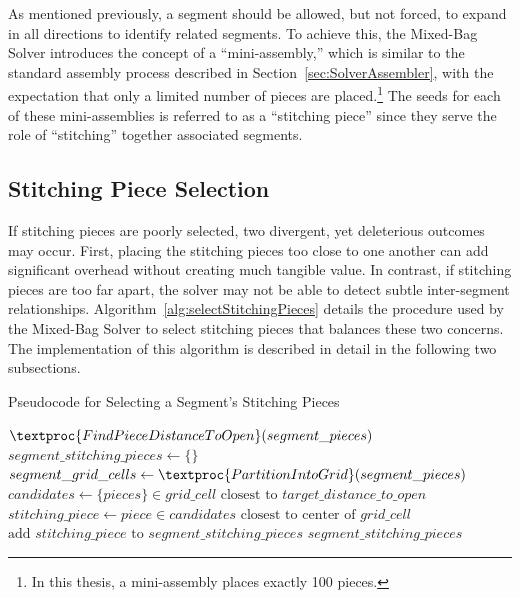 As mentioned previously, a segment should be allowed, but not forced, to expand in all directions to identify related segments.  To achieve this, the Mixed-Bag Solver introduces the concept of a ``mini-assembly,'' which is similar to the standard assembly process described in Section~\ref{sec:SolverAssembler}, with the expectation that only a limited number of pieces are placed.\footnote{In this thesis, a mini-assembly places exactly 100 pieces.}  The seeds for each of these mini-assemblies is referred to as a ``stitching piece'' since they serve the role of ``stitching'' together associated segments.

\subsection{Stitching Piece Selection}\label{sec:stitchingPieceSelection}

If stitching pieces are poorly selected, two divergent, yet deleterious outcomes may occur.  First, placing the stitching pieces too close to one another can add significant overhead without creating much tangible value.  In contrast, if stitching pieces are too far apart, the solver may not be able to detect subtle inter-segment relationships.  Algorithm~\ref{alg:selectStitchingPieces} details the procedure used by the Mixed-Bag Solver to select stitching pieces that balances these two concerns.  The implementation of this algorithm is described in detail in the following two subsections.

\begin{algorithm}[t]
\caption{Pseudocode for Selecting a Segment's Stitching Pieces}
\label{alg:selectStitchingPieces}
\begin{algorithmic}[1]
	\State $\textproc{FindPieceDistanceToOpen}(segment\_pieces)$
	\State $segment\_stitching\_pieces \gets \{ \}$
    \State $segment\_grid\_cells \gets \textproc{PartitionIntoGrid}(segment\_pieces)$
			\State $candidates \gets \{ pieces \} \in grid\_cell \text{ closest to } target\_distance\_to\_open$
			\State $stitching\_piece \gets piece \in candidates \text{ closest to center of } grid\_cell$
			\State $\text{add } stitching\_piece \text{ to } segment\_stitching\_pieces$
		\EndIf
	\EndFor
	\State \Return $segment\_stitching\_pieces$
\EndProcedure
\end{algorithmic}
\end{algorithm}


